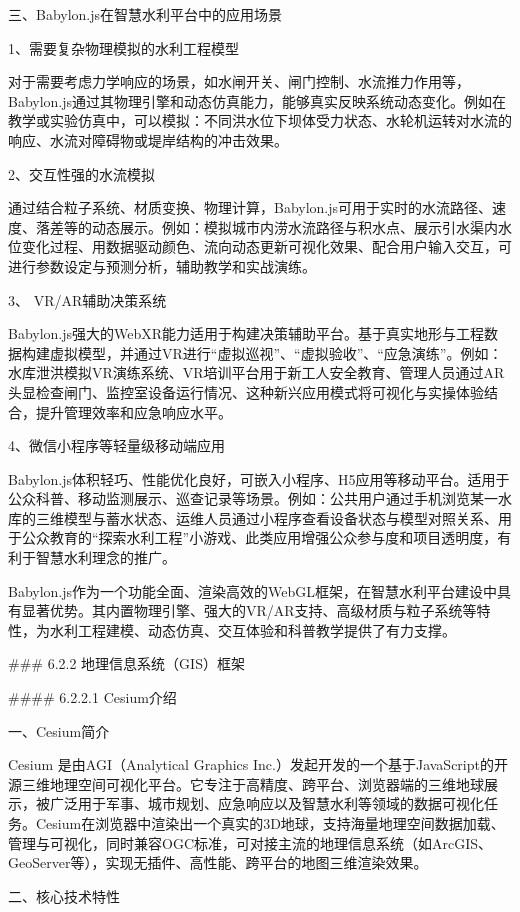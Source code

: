 三、Babylon.js在智慧水利平台中的应用场景

1、需要复杂物理模拟的水利工程模型

对于需要考虑力学响应的场景，如水闸开关、闸门控制、水流推力作用等，Babylon.js通过其物理引擎和动态仿真能力，能够真实反映系统动态变化。例如在教学或实验仿真中，可以模拟：不同洪水位下坝体受力状态、水轮机运转对水流的响应、水流对障碍物或堤岸结构的冲击效果。

2、交互性强的水流模拟

通过结合粒子系统、材质变换、物理计算，Babylon.js可用于实时的水流路径、速度、落差等的动态展示。例如：模拟城市内涝水流路径与积水点、展示引水渠内水位变化过程、用数据驱动颜色、流向动态更新可视化效果、配合用户输入交互，可进行参数设定与预测分析，辅助教学和实战演练。

3、 VR/AR辅助决策系统

Babylon.js强大的WebXR能力适用于构建决策辅助平台。基于真实地形与工程数据构建虚拟模型，并通过VR进行``虚拟巡视''、``虚拟验收''、``应急演练''。例如：水库泄洪模拟VR演练系统、VR培训平台用于新工人安全教育、管理人员通过AR头显检查闸门、监控室设备运行情况、这种新兴应用模式将可视化与实操体验结合，提升管理效率和应急响应水平。

4、微信小程序等轻量级移动端应用

Babylon.js体积轻巧、性能优化良好，可嵌入小程序、H5应用等移动平台。适用于公众科普、移动监测展示、巡查记录等场景。例如：公共用户通过手机浏览某一水库的三维模型与蓄水状态、运维人员通过小程序查看设备状态与模型对照关系、用于公众教育的``探索水利工程''小游戏、此类应用增强公众参与度和项目透明度，有利于智慧水利理念的推广。

Babylon.js作为一个功能全面、渲染高效的WebGL框架，在智慧水利平台建设中具有显著优势。其内置物理引擎、强大的VR/AR支持、高级材质与粒子系统等特性，为水利工程建模、动态仿真、交互体验和科普教学提供了有力支撑。

\#\#\# 6.2.2 地理信息系统（GIS）框架

\#\#\#\# 6.2.2.1 Cesium介绍

一、Cesium简介

Cesium 是由AGI（Analytical Graphics Inc.）发起开发的一个基于JavaScript的开源三维地理空间可视化平台。它专注于高精度、跨平台、浏览器端的三维地球展示，被广泛用于军事、城市规划、应急响应以及智慧水利等领域的数据可视化任务。Cesium在浏览器中渲染出一个真实的3D地球，支持海量地理空间数据加载、管理与可视化，同时兼容OGC标准，可对接主流的地理信息系统（如ArcGIS、GeoServer等），实现无插件、高性能、跨平台的地图三维渲染效果。

二、核心技术特性

